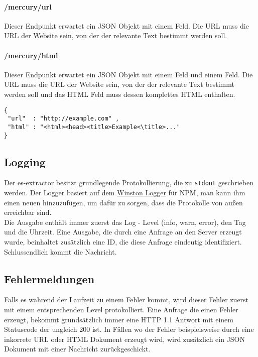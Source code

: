 \paragraph{/mercury/url} Dieser Endpunkt erwartet ein \ac{JSON} Objekt mit einem  Feld. Die URL muss die URL der Website sein, von der der relevante Text bestimmt werden soll.
\paragraph{/mercury/html} Dieser Endpunkt erwartet ein \ac{JSON} Objekt mit einem  Feld und einem  Feld. Die URL muss die URL der Website sein, von der der relevante Text bestimmt werden soll und das HTML Feld muss dessen komplettes HTML enthalten.
\begin{verbatim}
{
 "url"  : "http://example.com" , 
 "html" : "<html><head><title>Example<\title>..."
}
\end{verbatim}
\subsection{Logging}
Der es-extractor besitzt grundlegende Protokollierung, die zu \verb|stdout| geschrieben werden. Der Logger basiert auf dem \hyperref{https://www.npmjs.com/package/winston}{}{}{Winston Logger} für NPM, man kann ihm einen neuen  hinzuzufügen, um dafür zu sorgen, dass die Protokolle von außen erreichbar sind. \\ 
Die Ausgabe enthält immer zuerst das Log - Level (info, warn, error), den Tag und die Uhrzeit. Eine Ausgabe, die durch eine Anfrage an den Server erzeugt wurde, beinhaltet zusätzlich eine ID, die diese Anfrage eindeutig identifiziert. Schlussendlich kommt die Nachricht.
\subsection{Fehlermeldungen}
Falls es während der Laufzeit zu einem Fehler kommt, wird dieser Fehler zuerst mit einem entsprechenden Level protokolliert. Eine Anfrage die einen Fehler erzeugt, bekommt grundsätzlich immer eine HTTP 1.1 Antwort mit einem Statuscode der ungleich 200 ist. In Fällen wo der Fehler beispielsweise durch eine inkorrete URL oder HTML Dokument erzeugt wird, wird zusätzlich ein JSON Dokument mit einer Nachricht zurückgeschickt.



















